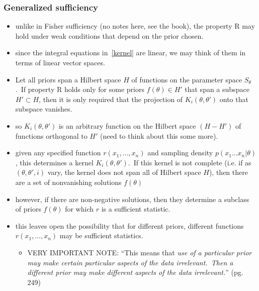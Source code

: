 \documentclass[../jaynes_prob_theory_notes.tex]{subfiles}
\begin{document}
            \subsubsection{Generalized sufficiency}
                \begin{itemize}
                    \item unlike in Fisher sufficiency (no notes here, see the book), the property R may hold under weak conditions that depend on the prior chosen.
                    \item since the integral equations in~\ref{kernel} are linear, we may think of them in terms of linear vector spaces.
                    \item Let all priors span a Hilbert space $H$ of functions on the parameter space $S_{\theta}$.\ If property R holds only for some priors $f(\theta) \in H'$ that span a subspace $H' \subset H$, then it is only required that the projection of $K_{i}(\theta, {\theta}')$ onto that subspace vanishes.
                    \item so $K_{i}(\theta, {\theta}')$ is an arbitrary function on the Hilbert space $(H - H')$ of functions orthogonal to $H'$ (need to think about this some more).
                    \item given any specified function $r(x_1, \ldots, x_n)$ and sampling density $p(x_1 \ldots x_n | \theta)$, this determines a kernel $K_{i}(\theta, {\theta}')$.\ If this kernel is not complete (i.e. if as $(\theta, {\theta}', i)$ vary, the kernel does not span all of Hilbert space $H$), then there are a set of nonvanishing solutions $f(\theta)$
                    \item however, if there are non-negative solutions, then they determine a subclass of priors $f(\theta)$ for which $r$ is a sufficient statistic.
                    \item this leaves open the possibility that for different priors, different functions $r(x_1, \ldots, x_n)$ may be sufficient statistics.
                        \begin{itemize}
                            \item VERY IMPORTANT NOTE: ``This means that \textit{use of a particular prior may make certain particular aspects of the data irrelevant.\ Then a different prior may make different aspects of the data irrelevant.}'' (pg. 249)
                        \end{itemize}
                \end{itemize}
\end{document}
